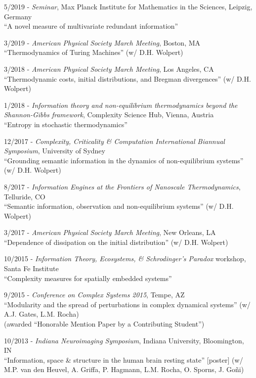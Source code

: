 \documentclass[margin,line,centered]{res}
\begin{document}
\begin{resume}
5/2019 - \emph{Seminar}, Max Planck Institute for Mathematics in the Sciences, Leipzig, Germany\\
``A novel measure of multivariate redundant information''

3/2019 - \emph{American Physical Society March Meeting}, Boston, MA\\
``Thermodynamics of Turing Machines'' (w/ D.H. Wolpert)%

3/2018 - \emph{American Physical Society March Meeting}, Los Angeles, CA\\
``Thermodynamic costs, initial distributions, and Bregman divergences'' (w/ D.H. Wolpert)%

1/2018 - \emph{Information theory and non-equilibrium thermodynamics beyond the Shannon-Gibbs framework}, Complexity Science Hub, Vienna, Austria\\
``Entropy in stochastic thermodynamics''

12/2017 - \emph{Complexity, Criticality \& Computation International Biannual Symposium}, University of Sydney\\
``Grounding semantic information in the dynamics of non-equilibrium systems'' (w/ D.H. Wolpert)

8/2017 - \emph{Information Engines at the Frontiers of Nanoscale Thermodynamics}, Telluride, CO\\
``Semantic information, observation and non-equilibrium systems'' (w/ D.H. Wolpert) %

3/2017 - \emph{American Physical Society March Meeting}, New Orleans, LA\\
``Dependence of dissipation on the initial distribution'' (w/ D.H. Wolpert)%

10/2015 - \emph{Information Theory, Ecosystems, \& Schrodinger's Paradox} workshop, Santa Fe Institute\\
``Complexity measures for spatially embedded systems''

9/2015 - \emph{Conference on Complex Systems 2015}, Tempe, AZ\\
``Modularity and the spread of perturbations in complex dynamical systems'' (w/ A.J. Gates, L.M. Rocha)\\
(awarded ``Honorable Mention Paper by a Contributing Student'')

10/2013 - \emph{Indiana Neuroimaging Symposium}, Indiana University, Bloomington, IN\\
``Information, space \& structure in the human brain resting state'' [poster] (w/ M.P. van den Heuvel, A. Griffa, P. Hagmann, L.M. Rocha, O. Sporns, J. Goñi)


\end{resume}
\end{document}

